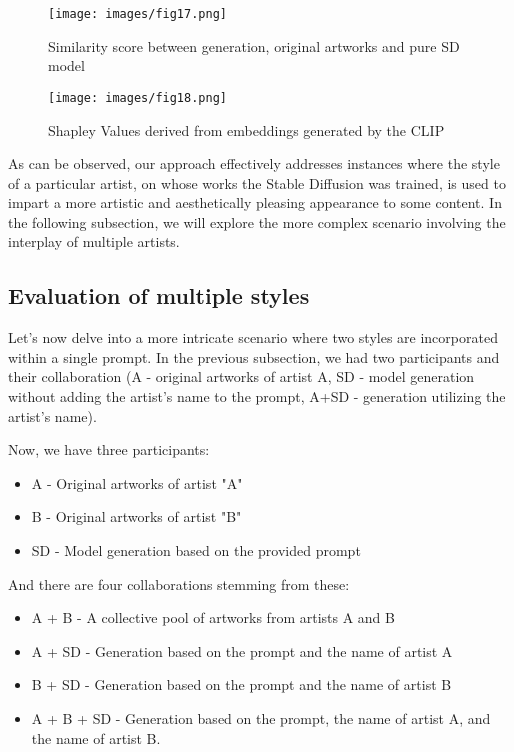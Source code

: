 \documentclass[12pt, letterpaper]{article}
\begin{document}
\begin{figure}[h]
    \centering
    \begin{minipage}{0.55\textwidth}
        \centering
        \texttt{[image: images/fig17.png]}
        \caption{Similarity score between generation, original artworks and pure SD model}
        \label{fig17:image1}
    \end{minipage}\hfill
    \begin{minipage}{0.40\textwidth}
        \centering
        \texttt{[image: images/fig18.png]}
        \caption{Shapley Values derived from embeddings generated by the CLIP}
        \label{fig18:image1}
    \end{minipage}
\end{figure}

As can be observed, our approach effectively addresses instances where the style of a particular artist, on whose works the Stable Diffusion was trained, is used to impart a more artistic and aesthetically pleasing appearance to some content. In the following subsection, we will explore the more complex scenario involving the interplay of multiple artists.

\subsection{Evaluation of multiple styles}
\label{subsec:multiple_style}

Let's now delve into a more intricate scenario where two styles are incorporated within a single prompt. In the previous subsection, we had two participants and their collaboration (A - original artworks of artist A, SD - model generation without adding the artist's name to the prompt, A+SD - generation utilizing the artist's name).

Now, we have three participants:
\begin{itemize}[itemsep=0pt]
    \item A - Original artworks of artist "A"
    \item B - Original artworks of artist "B"
    \item SD - Model generation based on the provided prompt
\end{itemize}
And there are four collaborations stemming from these:
\begin{itemize}[itemsep=0pt]
    \item A + B - A collective pool of artworks from artists A and B
    \item A + SD - Generation based on the prompt and the name of artist A
    \item B + SD - Generation based on the prompt and the name of artist B
    \item A + B + SD - Generation based on the prompt, the name of artist A, and the name of artist B.
\end{itemize}
\end{document}
